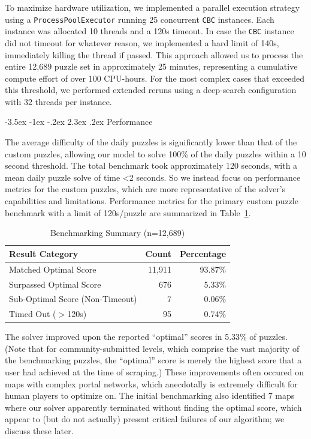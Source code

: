 \documentclass[sigconf,nonacm]{acmart}
\makeatletter
\renewcommand{\section}{\@startsection{section}{1}{\z@}%
  {-3.5ex \@plus -1ex \@minus -.2ex}%
  {2.3ex \@plus.2ex}%
  {\reset@font\Large\bfseries}}
\makeatother
\begin{document}
To maximize hardware utilization, we implemented a parallel execution strategy using a \texttt{ProcessPoolExecutor} running 25 concurrent \texttt{CBC} instances. Each instance was allocated 10 threads and a 120s timeout. In case the \texttt{CBC} instance did not timeout for whatever reason, we implemented a hard limit of 140s, immediately killing the thread if passed. This approach allowed us to process the entire 12,689 puzzle set in approximately 25 minutes, representing a cumulative compute effort of over 100 CPU-hours. For the most complex cases that exceeded this threshold, we performed extended reruns using a deep-search configuration with 32 threads per instance.

\section{Performance}

The average difficulty of the daily puzzles is significantly lower than that of the custom puzzles, allowing our model to solve 100\% of the daily puzzles within a 10 second threshold. The total benchmark took approximately 120 seconds, with a mean daily puzzle solve of time <2 seconds. So we instead focus on performance metrics for the custom puzzles, which are more representative of the solver's capabilities and limitations. Performance metrics for the primary custom puzzle benchmark with a limit of 120s/puzzle are summarized in Table~\ref{tab:bench}.

\begin{table}[h]
  \centering
  \caption{Benchmarking Summary (n=12,689)}
  \label{tab:bench}
  \begin{tabular}{lrr}
    \toprule
    Result Category & Count & Percentage \\
    \midrule
    Matched Optimal Score & 11,911 & 93.87\% \\
    Surpassed Optimal Score & 676 & 5.33\% \\
    Sub-Optimal Score (Non-Timeout) & 7 & 0.06\% \\
    Timed Out ($>$120s) & 95 & 0.74\% \\
    \bottomrule
  \end{tabular}
\end{table}

The solver improved upon the reported ``optimal'' scores in 5.33\% of puzzles. (Note that for community-submitted levels, which comprise the vast majority of the benchmarking puzzles, the ``optimal'' score is merely the highest score that a user had achieved at the time of scraping.) These improvements often occured on maps with complex portal networks, which anecdotally is extremely difficult for human players to optimize on. The initial benchmarking also identified 7 maps where our solver apparently terminated without finding the optimal score, which appear to (but do not actually) present critical failures of our algorithm; we discuss these later.
\end{document}
